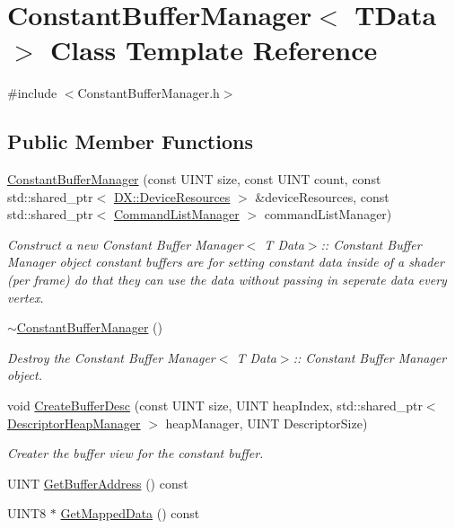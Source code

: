 \hypertarget{class_constant_buffer_manager}{}\section{Constant\+Buffer\+Manager$<$ T\+Data $>$ Class Template Reference}
\label{class_constant_buffer_manager}


{\ttfamily \#include $<$Constant\+Buffer\+Manager.\+h$>$}

\subsection*{Public Member Functions}
\begin{DoxyCompactItemize}
\item 
\mbox{\hyperlink{class_constant_buffer_manager_a1b7d5f45ddc84402db2ba342d3e3b277}{Constant\+Buffer\+Manager}} (const U\+I\+NT size, const U\+I\+NT count, const std\+::shared\+\_\+ptr$<$ \mbox{\hyperlink{class_d_x_1_1_device_resources}{D\+X\+::\+Device\+Resources}} $>$ \&device\+Resources, const std\+::shared\+\_\+ptr$<$ \mbox{\hyperlink{class_command_list_manager}{Command\+List\+Manager}} $>$ command\+List\+Manager)
\begin{DoxyCompactList}\small\item\em Construct a new Constant Buffer Manager$<$ T Data$>$\+:\+: Constant Buffer Manager object constant buffers are for setting constant data inside of a shader (per frame) do that they can use the data without passing in seperate data every vertex. \end{DoxyCompactList}\item 
\mbox{\hyperlink{class_constant_buffer_manager_a837ca267d583694e3641997f0b611b30}{$\sim$\+Constant\+Buffer\+Manager}} ()
\begin{DoxyCompactList}\small\item\em Destroy the Constant Buffer Manager$<$ T Data$>$\+:\+: Constant Buffer Manager object. \end{DoxyCompactList}\item 
void \mbox{\hyperlink{class_constant_buffer_manager_ae2b99485f70df0dd8056164be91cc368}{Create\+Buffer\+Desc}} (const U\+I\+NT size, U\+I\+NT heap\+Index, std\+::shared\+\_\+ptr$<$ \mbox{\hyperlink{class_descriptor_heap_manager}{Descriptor\+Heap\+Manager}} $>$ heap\+Manager, U\+I\+NT Descriptor\+Size)
\begin{DoxyCompactList}\small\item\em Creater the buffer view for the constant buffer. \end{DoxyCompactList}\item 
U\+I\+NT \mbox{\hyperlink{class_constant_buffer_manager_a1b2f4c04b281c3b47fd543d1bcb7a178}{Get\+Buffer\+Address}} () const
\item 
U\+I\+N\+T8 $\ast$ \mbox{\hyperlink{class_constant_buffer_manager_a431be2aa715a8605587a5aed489ffff8}{Get\+Mapped\+Data}} () const
\end{DoxyCompactItemize}
